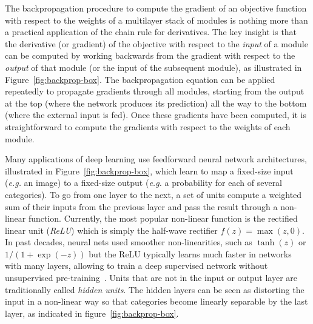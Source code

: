 \documentclass[10pts]{article}
\newcommand{\deri}[2]{\frac{\partial  #1}{\partial #2}}
\newcommand{\citep}[1]{\cite{#1}}
\begin{document}
The backpropagation procedure to compute the gradient of an objective
function with respect to the weights of a multilayer stack of modules
is nothing more than a practical application of the chain rule for
derivatives. The key insight is that the derivative (or gradient) of
the objective with respect to the {\it input} of a module can be
computed by working backwards from the gradient with respect to the
{\em output} of that module (or the input of the subsequent
module), as illustrated in Figure~\ref{fig:backprop-box}.
The backpropagation equation can be applied repeatedly to propagate
gradients through all modules, starting from the output at the top 
(where the network produces its prediction) all the way to the bottom
(where the external input is fed). Once these
gradients have been computed, it is straightforward to compute the gradients 
with respect to the weights of each module. 

Many applications of deep learning use feedforward neural network
architectures, illustrated in Figure~\ref{fig:backprop-box}, which
learn to map a fixed-size input ({\it e.g.} an image) to a fixed-size
output ({\it e.g.} a probability for each of several categories). To
go from one layer to the next, a set of units compute a weighted sum
of their inputs from the previous layer and pass the result through a
non-linear function. Currently, the most popular non-linear function
is the rectified linear unit ({\em ReLU}) which is simply
the half-wave rectifier $f(z) = \max(z,0)$. In past decades, neural
nets used smoother non-linearities, such as $\tanh(z)$ or
$1/(1+\exp(-z))$ but the ReLU typically learns much faster in networks
with many layers, allowing to train a deep supervised network
without unsupervised pre-training~\citep{Glorot+al-AI-2011-small}. 
Units that are not in the input or output layer are
traditionally called {\em hidden units}. The hidden layers can be seen
as distorting the input in a non-linear way so that categories become
linearly separable by the last layer, as indicated in
figure~\ref{fig:backprop-box}.
\end{document}
